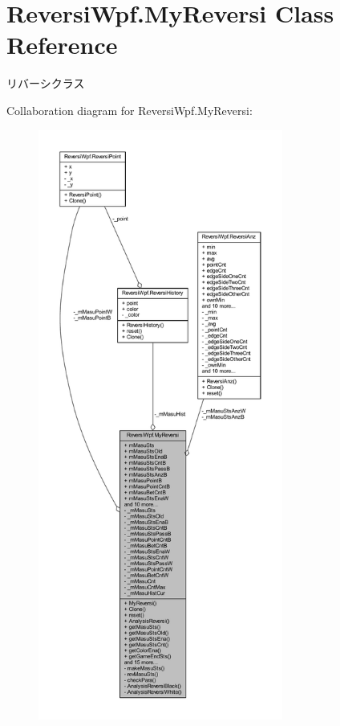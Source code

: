 \hypertarget{class_reversi_wpf_1_1_my_reversi}{}\section{Reversi\+Wpf.\+My\+Reversi Class Reference}
\label{class_reversi_wpf_1_1_my_reversi}


リバーシクラス  




Collaboration diagram for Reversi\+Wpf.\+My\+Reversi\+:
\nopagebreak
\begin{figure}[H]
\begin{center}
\leavevmode
\includegraphics[height=550pt]{class_reversi_wpf_1_1_my_reversi__coll__graph}
\end{center}
\end{figure}
